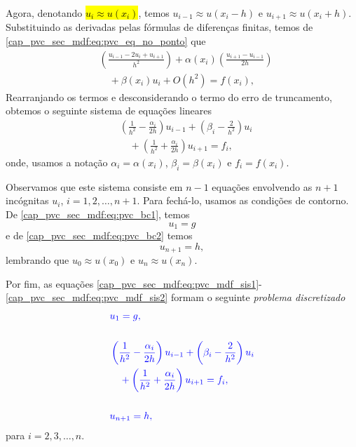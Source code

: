 Agora, denotando \hl{$u_i \approx u(x_i)$}, temos $u_{i-1}\approx u(x_i-h)$ e $u_{i+1}\approx u(x_i+h)$. Substituindo as derivadas pelas fórmulas de diferenças finitas, temos de \eqref{cap_pvc_sec_mdf:eq:pvc_eq_no_ponto} que
\begin{equation}
  \begin{aligned}
    &\left(\frac{u_{i-1}-2u_i+u_{i+1}}{h^2}\right) + \alpha(x_i)\left(\frac{u_{i+1}-u_{i-1}}{2h}\right) \\
    &\quad + \beta(x_i)u_i + O(h^2) = f(x_i),
  \end{aligned}
\end{equation}
Rearranjando os termos e desconsiderando o termo do erro de truncamento, obtemos o seguinte sistema de equações lineares
\begin{equation}\label{cap_pvc_sec_mdf:eq:pvc_mdf_sis1}
  \begin{aligned}
    &\left(\frac{1}{h^2}-\frac{\alpha_i}{2h}\right)u_{i-1} + \left(\beta_i - \frac{2}{h^2}\right)u_i\\
    &\quad + \left(\frac{1}{h^2}+\frac{\alpha_i}{2h}\right)u_{i+1} = f_i, 
  \end{aligned}
\end{equation}
onde, usamos a notação $\alpha_i = \alpha(x_i)$, $\beta_i = \beta(x_i)$ e $f_i = f(x_i)$.

Observamos que este sistema consiste em $n-1$ equações envolvendo as $n+1$ incógnitas $u_i$, $i=1, 2, \dotsc, n+1$. Para fechá-lo, usamos as condições de contorno. De \eqref{cap_pvc_sec_mdf:eq:pvc_bc1}, temos
\begin{equation}\label{cap_pvc_sec_mdf:eq:pvc_mdf_sis0}
  u_1 = g
\end{equation}
e de \eqref{cap_pvc_sec_mdf:eq:pvc_bc2} temos
\begin{equation}\label{cap_pvc_sec_mdf:eq:pvc_mdf_sis2}
  u_{n+1} = h,
\end{equation}
lembrando que $u_0\approx u(x_0)$ e $u_n\approx u(x_n)$.

Por fim, as equações \eqref{cap_pvc_sec_mdf:eq:pvc_mdf_sis1}-\eqref{cap_pvc_sec_mdf:eq:pvc_mdf_sis2} formam o seguinte \emph{problema discretizado}
\begin{subequations}\label{cap_pvc_sec_mdf:eq:pd}\hleq
  \begin{align}
    &u_1 = g,\\
    &~\nonumber\\
    &\left(\frac{1}{h^2}-\frac{\alpha_i}{2h}\right)u_{i-1} + \left(\beta_i - \frac{2}{h^2}\right)u_i \nonumber\\
    &\quad + \left(\frac{1}{h^2}+\frac{\alpha_i}{2h}\right)u_{i+1} = f_i,\\
    &~\nonumber\\
    &u_{n+1} = h,
  \end{align}
\end{subequations}
para $i = 2, 3, \dotsc, n$.

